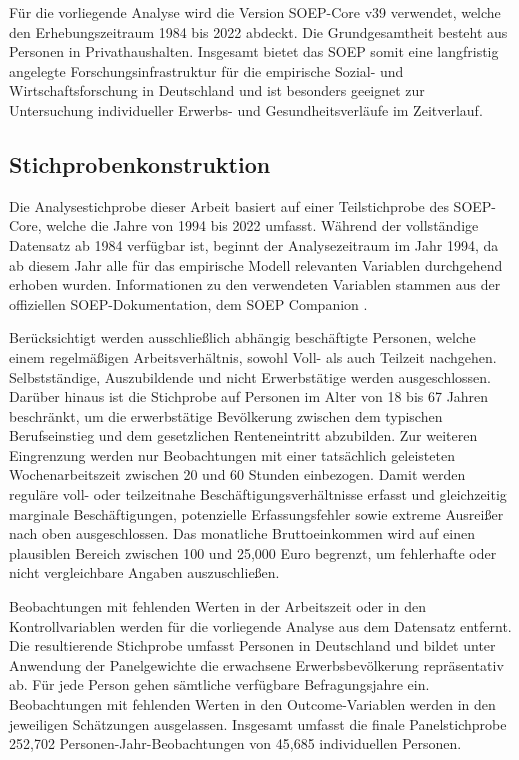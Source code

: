 \documentclass[12pt,a4paper]{article}
\begin{document}
Für die vorliegende Analyse wird die Version SOEP-Core v39 \parencite{soep_data} verwendet, welche den Erhebungszeitraum 1984 bis 2022 abdeckt. Die Grundgesamtheit besteht aus Personen in  Privathaushalten. Insgesamt bietet das SOEP somit eine langfristig angelegte Forschungsinfrastruktur für die empirische Sozial- und Wirtschaftsforschung in Deutschland und ist besonders geeignet zur Untersuchung individueller Erwerbs- und Gesundheitsverläufe im Zeitverlauf. 

\subsection{Stichprobenkonstruktion}
Die Analysestichprobe dieser Arbeit basiert auf einer Teilstichprobe des SOEP-Core, welche die Jahre von 1994 bis 2022 umfasst. Während der vollständige Datensatz ab 1984 verfügbar ist, beginnt der Analysezeitraum im Jahr 1994, da ab diesem Jahr alle für das empirische Modell relevanten Variablen durchgehend erhoben wurden. Informationen zu den verwendeten Variablen stammen aus der offiziellen SOEP-Dokumentation, dem SOEP Companion \parencite{soep_companion}.

Berücksichtigt werden ausschließlich abhängig beschäftigte Personen, welche  einem regelmäßigen Arbeitsverhältnis, sowohl Voll- als auch Teilzeit nachgehen. Selbstständige, Auszubildende und nicht Erwerbstätige werden ausgeschlossen. Darüber hinaus ist die Stichprobe auf Personen im Alter von 18 bis 67 Jahren beschränkt, um die erwerbstätige Bevölkerung zwischen dem typischen Berufseinstieg und dem gesetzlichen Renteneintritt abzubilden. Zur weiteren Eingrenzung werden nur Beobachtungen mit einer tatsächlich geleisteten Wochenarbeitszeit zwischen 20 und 60 Stunden einbezogen. Damit werden reguläre voll- oder teilzeitnahe Beschäftigungsverhältnisse erfasst und gleichzeitig marginale Beschäftigungen, potenzielle Erfassungsfehler sowie extreme Ausreißer nach oben ausgeschlossen. Das monatliche Bruttoeinkommen wird  auf einen plausiblen Bereich zwischen 100 und 25,000 Euro begrenzt, um fehlerhafte oder nicht vergleichbare Angaben auszuschließen. 

Beobachtungen mit fehlenden Werten in der Arbeitszeit oder in den Kontrollvariablen werden für die vorliegende Analyse aus dem Datensatz entfernt. Die resultierende Stichprobe umfasst Personen in Deutschland und bildet unter Anwendung der Panelgewichte die erwachsene Erwerbsbevölkerung repräsentativ ab. Für jede Person gehen sämtliche verfügbare Befragungsjahre ein. Beobachtungen mit fehlenden Werten in den Outcome-Variablen werden in den jeweiligen Schätzungen ausgelassen. Insgesamt umfasst die finale Panelstichprobe 252,702 Personen-Jahr-Beobachtungen von 45,685 individuellen Personen. 
\end{document}
